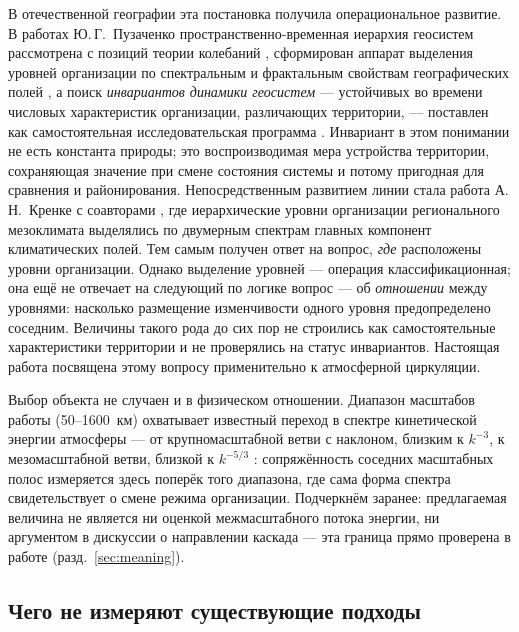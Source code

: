 \documentclass[11pt,a4paper]{article}
\begin{document}
В отечественной географии эта постановка получила операциональное развитие. В работах Ю.\,Г.~Пузаченко пространственно-временная иерархия геосистем рассмотрена с позиций теории колебаний \cite{Puzachenko1986}, сформирован аппарат выделения уровней организации по спектральным и фрактальным свойствам географических полей \cite{Puzachenko2004}, а поиск \emph{инвариантов динамики геосистем} --- устойчивых во времени числовых характеристик организации, различающих территории, --- поставлен как самостоятельная исследовательская программа \cite{Puzachenko2010}. Инвариант в этом понимании не есть константа природы; это воспроизводимая мера устройства территории, сохраняющая значение при смене состояния системы и потому пригодная для сравнения и районирования. Непосредственным развитием линии стала работа А.\,Н.~Кренке с соавторами \cite{Krenke2019}, где иерархические уровни организации регионального мезоклимата выделялись по двумерным спектрам главных компонент климатических полей. Тем самым получен ответ на вопрос, \emph{где} расположены уровни организации. Однако выделение уровней --- операция классификационная; она ещё не отвечает на следующий по логике вопрос --- об \emph{отношении} между уровнями: насколько размещение изменчивости одного уровня предопределено соседним. Величины такого рода до сих пор не строились как самостоятельные характеристики территории и не проверялись на статус инвариантов. Настоящая работа посвящена этому вопросу применительно к атмосферной циркуляции.

Выбор объекта не случаен и в физическом отношении. Диапазон масштабов работы (50--1600~км) охватывает известный переход в спектре кинетической энергии атмосферы --- от крупномасштабной ветви с наклоном, близким к $k^{-3}$, к мезомасштабной ветви, близкой к $k^{-5/3}$ \cite{NastromGage1985}: сопряжённость соседних масштабных полос измеряется здесь поперёк того диапазона, где сама форма спектра свидетельствует о смене режима организации. Подчеркнём заранее: предлагаемая величина не является ни оценкой межмасштабного потока энергии, ни аргументом в дискуссии о направлении каскада --- эта граница прямо проверена в работе (разд.~\ref{sec:meaning}).

\subsection{Чего не измеряют существующие подходы}
\end{document}
